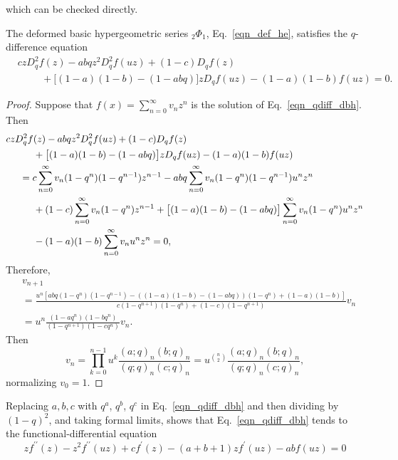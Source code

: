 \documentclass{cimart}
\begin{document}
which can be checked directly. 
\begin{theorem}
The deformed basic hypergeometric series ${}_{2}\Phi_{1}$, Eq.~\eqref{eqn_def_he}, satisfies the $q$-difference equation
\begin{align}\label{eqn_qdiff_dbh}
    &czD_{q}^{2}f(z)-abqz^2D_{q}^2f(uz)+(1-c)D_{q}f(z)\nonumber\\
    &\hspace{1cm}+\big[(1-a)(1-b)-(1-abq)\big]zD_{q}f(uz)-(1-a)(1-b)f(uz)=0.
\end{align}
\end{theorem}
\begin{proof}
Suppose that $f(x)=\sum_{n=0}^{\infty}v_{n}z^n$ is the solution of Eq.~\eqref{eqn_qdiff_dbh}. Then
\begin{align*}
    &czD_{q}^{2}f(z)-abqz^2D_{q}^{2}f(uz)+(1-c)D_{q}f(z)\\
    &\hspace{1cm}+\big[(1-a)(1-b)-(1-abq)\big]zD_{q}f(uz)-(1-a)(1-b)f(uz)\\
    &\hspace{0.5cm}=c\sum_{n=0}^{\infty}v_{n}(1-q^n)(1-q^{n-1})z^{n-1}-abq\sum_{n=0}^{\infty}v_{n}(1-q^n)(1-q^{n-1})u^nz^{n}\\
    &\hspace{1cm}+(1-c)\sum_{n=0}^{\infty}v_{n}(1-q^n)z^{n-1}+\big[(1-a)(1-b)-(1-abq)\big]\sum_{n=0}^{\infty}v_{n}(1-q^n)u^nz^{n}\\
    &\hspace{1cm}-(1-a)(1-b)\sum_{n=0}^{\infty}v_{n}u^nz^n=0,
\end{align*}
Therefore, 
\begin{align*}
    &v_{n+1}\\
    &=\frac{u^n[abq(1-q^n)(1-q^{n-1})-((1-a)(1-b)-(1-abq))(1-q^n)+(1-a)(1-b)]}{c(1-q^{n+1})(1-q^n)+(1-c)(1-q^{n+1})}v_{n}\\
    &=u^n\frac{(1-aq^n)(1-bq^n)}{(1-q^{n+1})(1-cq^n)}v_{n}.
\end{align*}
Then
\begin{equation*}
    v_{n}=\prod_{k=0}^{n-1}u^k\frac{(a;q)_{n}(b;q)_{n}}{(q;q)_{n}(c;q)_{n}}=u^{\binom{n}{2}}\frac{(a;q)_{n}(b;q)_{n}}{(q;q)_{n}(c;q)_{n}},
\end{equation*}
normalizing $v_{0}=1$.
\end{proof}
Replacing $a,b,c$ with $q^a$, $q^b$, $q^c$ in Eq.~\eqref{eqn_qdiff_dbh} and then dividing by $(1-q)^2$, and taking formal limits, shows that Eq.~\eqref{eqn_qdiff_dbh} tends to the functional-differential equation
\begin{equation}\label{eqn_fdiff_hyp}
    zf^{\prime\prime}(z)-z^2f^{\prime\prime}(uz)+cf^{\prime}(z)-(a+b+1)zf^{\prime}(uz)-abf(uz)=0
\end{equation}
\end{document}
